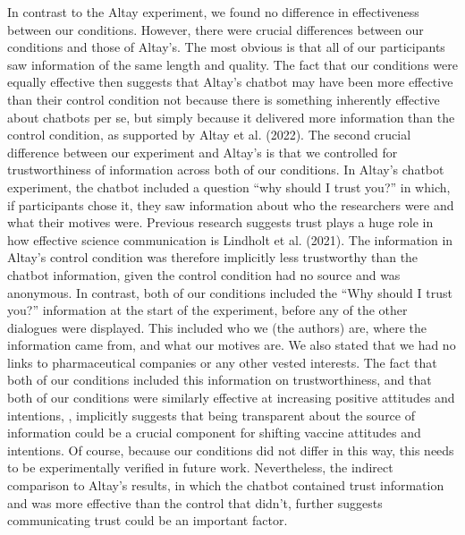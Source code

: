 \documentclass[
  english,
  ,jou,floatsintext]{apa6}
\begin{document}
In contrast to the Altay experiment, we found no difference in effectiveness between our conditions. However, there were crucial differences between our conditions and those of Altay's. The most obvious is that all of our participants saw information of the same length and quality. The fact that our conditions were equally effective then suggests that Altay's chatbot may have been more effective than their control condition not because there is something inherently effective about chatbots per se, but simply because it delivered more information than the control condition, as supported by Altay et al. (2022). The second crucial difference between our experiment and Altay's is that we controlled for trustworthiness of information across both of our conditions. In Altay's chatbot experiment, the chatbot included a question ``why should I trust you?'' in which, if participants chose it, they saw information about who the researchers were and what their motives were. Previous research suggests trust plays a huge role in how effective science communication is Lindholt et al. (2021). The information in Altay's control condition was therefore implicitly less trustworthy than the chatbot information, given the control condition had no source and was anonymous. In contrast, both of our conditions included the ``Why should I trust you?'' information at the start of the experiment, before any of the other dialogues were displayed. This included who we (the authors) are, where the information came from, and what our motives are. We also stated that we had no links to pharmaceutical companies or any other vested interests. The fact that both of our conditions included this information on trustworthiness, and that both of our conditions were similarly effective at increasing positive attitudes and intentions, , implicitly suggests that being transparent about the source of information could be a crucial component for shifting vaccine attitudes and intentions. Of course, because our conditions did not differ in this way, this needs to be experimentally verified in future work. Nevertheless, the indirect comparison to Altay's results, in which the chatbot contained trust information and was more effective than the control that didn't, further suggests communicating trust could be an important factor.
\end{document}
